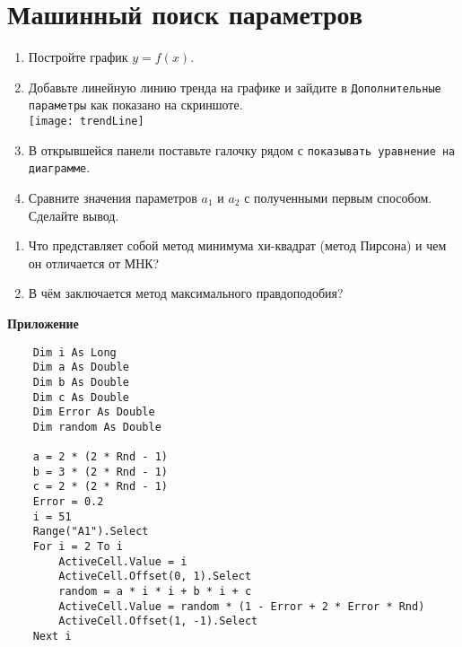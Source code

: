 \documentclass[14pt,a4paper]{article}
\begin{document}
\section{Машинный поиск параметров}
\begin{enumerate}
	\item Постройте график $y = f(x)$.
	\item Добавьте линейную линию тренда на графике и зайдите в \texttt{Дополнительные параметры} как показано на скриншоте.\\
	\texttt{[image: trendLine]}
	\item В открывшейся панели поставьте галочку рядом с \texttt{показывать уравнение на диаграмме}.
	\item Сравните значения параметров $a_1$ и $a_2$ с полученными первым способом. Сделайте вывод.
\end{enumerate}

\questions{}
\begin{enumerate}
	\item Что представляет собой метод минимума хи-квадрат (метод Пирсона) и чем он отличается от МНК?
	\item В чём заключается метод максимального правдоподобия?
\end{enumerate}

\printbibliography[title={Литература}]	
\begin{center}
	\textbf{\Large Приложение}
\end{center}
	\renewcommand{\lstlistingname}{Листинг}
\begin{lstlisting}
	Dim i As Long
	Dim a As Double
	Dim b As Double
	Dim c As Double
	Dim Error As Double
	Dim random As Double

	a = 2 * (2 * Rnd - 1)
	b = 3 * (2 * Rnd - 1)
	c = 2 * (2 * Rnd - 1)
	Error = 0.2
	i = 51
	Range("A1").Select
	For i = 2 To i
		ActiveCell.Value = i
		ActiveCell.Offset(0, 1).Select
		random = a * i * i + b * i + c
		ActiveCell.Value = random * (1 - Error + 2 * Error * Rnd)
		ActiveCell.Offset(1, -1).Select
	Next i
	\end{lstlisting}
\end{document}
